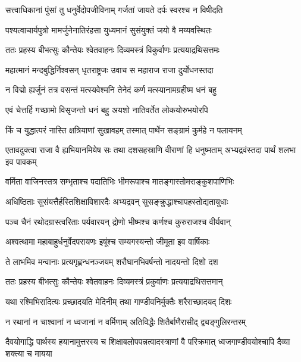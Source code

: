 \twolineshloka
{सत्त्वाधिकानां पुंसां तु धनुर्वेदोपजीविनाम्}
{गर्जतां जायते दर्पः स्वरश्च न विषीदति}


\twolineshloka
{पश्यत्वाचार्यपुत्रो मामर्जुनेनातिरंहसा}
{युध्यमानं सुसंयुक्तं जयो वै मय्यवस्थितः}



\twolineshloka
{ततः प्रहस्य बीभत्सुः कौन्तेयः श्वेतवाहनः}
{दिव्यमस्त्रं विकुर्वाणः प्रत्ययाद्रथिसत्तमः}


\twolineshloka
{महात्मानं मन्दबुद्धिर्निश्वसन् धृतराष्ट्रजः}
{उवाच स महाराज राजा दुर्योधनस्तदा}


\twolineshloka
{न विद्मो ह्यर्जुनं तत्र वसन्तं मत्स्यवेश्मनि}
{तेनेदं कर्ण मत्स्यानामग्रहीष्म धनं बहु}


\twolineshloka
{एवं चेत्तर्हि गच्छामो विसृजन्तो धनं बहु}
{अयशो नातिवर्तेत लोकयोरुभयोरपि}


\twolineshloka
{किं च युद्धात्परं नास्ति क्षत्रियाणां सुखावहम्}
{तस्मात् पार्थेन सङ्ग्रामं कुर्महे न पलायनम्}


\threelineshloka
{एतावदुक्त्वा राजा वै ह्यभियानमियेष सः}
{तथा दशसहस्राणि वीराणां हि धनुष्मताम्}
{अभ्यद्रवंस्तदा पार्थं शलभा इव पावकम्}


\twolineshloka
{वर्मिता वाजिनस्तत्र सम्भृताश्च पदातिभिः}
{भीमरूपाश्च मातङ्गास्तोमराङ्कुशपाणिभिः}



\twolineshloka
{अधिष्ठिताः सुसंयत्तैर्हस्तिशिक्षाविशारदैः}
{अभ्यद्रवन् सुसङ्क्रुद्धाश्चापहस्तोद्यतायुधाः}


\twolineshloka
{पञ्च चैनं रथोदग्रास्त्वरिताः पर्यवारयन्}
{द्रोणो भीष्मश्च कर्णश्च कुरुराजश्च वीर्यवान्}


\twolineshloka
{अश्वत्थामा महाबाहुर्धनुर्वेदपरायणः}
{इषूंश्च सम्यगस्यन्तो जीमूता इव वार्षिकाः}


\twolineshloka
{ते लाभमिव मन्वानाः प्रत्यगृह्णन्धनञ्जयम्}
{शरौघानभिवर्षन्तो नादयन्तो दिशो दश}


\twolineshloka
{ततः प्रहस्य बीभत्सुः कौन्तेयः श्वेतवाहनः}
{दिव्यमस्त्रं प्रकुर्वाणः प्रत्ययाद्रथिसत्तमान्}


\twolineshloka
{यथा रश्मिभिरादित्यः प्रच्छादयति मेदिनीम्}
{तथा गाण्डीवनिर्मुक्तैः शरैराच्छादयद् दिशः}


\twolineshloka
{न रथानां न चाश्वानां न ध्वजानां न वर्मिणाम्}
{अतिविद्धैः शितैर्बाणैरासीद् द्व्यङ्गुलिरन्तरम्}


\threelineshloka
{दैवयोगाद्धि पार्थस्य हयानामुत्तरस्य च}
{शिक्षाबलोपपन्नत्वादस्त्राणां वै परिक्रमात्}
{ध्वजगाण्डीवयोश्चापि दैव्या शक्त्या च मायया}


